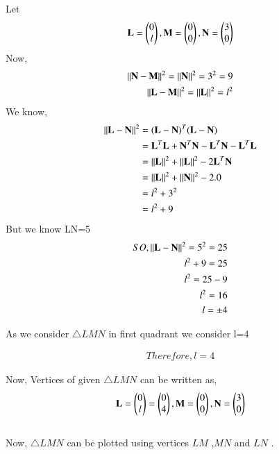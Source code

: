 \documentclass[journal,12pt,twocolumn]{IEEEtran}
\begin{document}
Let
\begin{align}
\textbf{L}=\begin{pmatrix}0 \\ l\end{pmatrix},
\textbf{M}=\begin{pmatrix}0 \\ 0\end{pmatrix} ,
\textbf{N}=\begin{pmatrix}3 \\ 0\end{pmatrix}
\end{align}
Now,
\begin{align}
\left\lVert\mathbf{N}-\mathbf{M}\right\rVert^2 = \left\lVert\mathbf{N}\right\rVert^2  = 3^2 =9
\\
\left\lVert\mathbf{L}-\mathbf{M}\right\rVert^2 = \left\lVert\mathbf{L}\right\rVert^2 =l^2
\end{align}
We know,
\begin{align}
\left\lVert\mathbf{L}-\mathbf{N}\right\rVert^2 &= ({\mathbf{L}-\mathbf{N}})^T({\mathbf{L}-\mathbf{N}})
\\
&= \mathbf{L}^T\mathbf{L}+\mathbf{N}^T\mathbf{N}-\mathbf{L}^T\mathbf{N} - \mathbf{L}^T\mathbf{L}
\\
&= \left\lVert\mathbf{L}\right\rVert^2 + \left\lVert\mathbf{L}\right\rVert^2 - 2\mathbf{L}^T\mathbf{N}
\\
&= \left\lVert\mathbf{L}\right\rVert^2 + \left\lVert\mathbf{N}\right\rVert^2-2.0
\\
&= l^2 + 3^2
\\
&=l^2+9
\end{align}
But we know LN=5 
\begin{align}
SO,
\left\lVert{\mathbf{L}-\mathbf{N}}\right\rVert^2=5^2=25
\\
l^2+9=25
\\
l^2=25-9
\\
l^2=16
\\
l=\pm4
\end{align}

As we consider $\triangle LMN$  in first quadrant we consider l=4

\begin{align}
Therefore,l=4
\end{align}

Now, Vertices of given $\triangle LMN$ can be written as,
\begin{align}
\mathbf{L} = \begin{pmatrix}0\\l\end{pmatrix}=\begin{pmatrix}0\\4\end{pmatrix}, \mathbf{M} = \begin{pmatrix}0\\0\end{pmatrix}, \mathbf{N} = \begin{pmatrix}3\\0\end{pmatrix}
\end{align}
\\
Now, $\triangle LMN$ can be plotted using vertices $LM$ ,$MN$ and $LN$ .
\\
\end{document}
